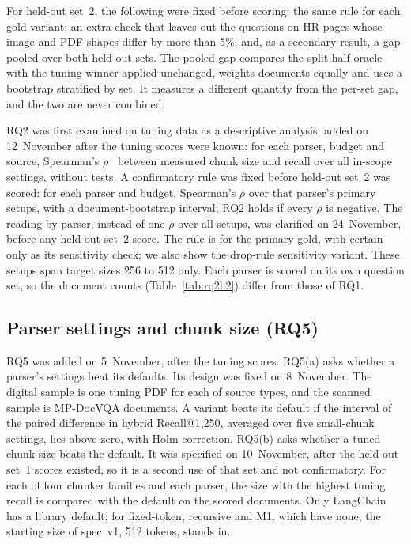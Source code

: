 For held-out set~2, the following were fixed before scoring: the same rule for
each gold variant; an extra check that leaves out the questions on \RQoneHRCheckPages{} HR pages
whose image and PDF shapes differ by more than 5\%; and, as a secondary
result, a gap pooled over both held-out sets. The pooled gap compares the
split-half oracle with the tuning winner applied unchanged, weights documents
equally and uses a bootstrap stratified by set. It measures a different
quantity from the per-set gap, and the two are never combined.

RQ2 was first examined on tuning data as a descriptive analysis, added on
12~November after the tuning scores were known: for each parser, budget and
source, Spearman's $\rho$~\cite{spearman} between measured chunk size and recall over all
in-scope settings, without tests. A confirmatory rule was fixed before
held-out set~2 was scored: for each parser and budget, Spearman's $\rho$ over
that parser's \RQtwoHTwoSetupsPerParser{} primary setups, with a
document-bootstrap interval; RQ2 holds if every $\rho$ is negative. The reading
by parser, instead of one $\rho$ over all \RQoneSetups{} setups, was
clarified on 24~November, before any held-out set~2 score. The rule is for the
primary gold, with certain-only as its sensitivity check; we also show the
drop-rule sensitivity variant. These setups span target sizes 256 to 512 only. Each parser is scored on
its own question set, so the document counts (Table~\ref{tab:rq2h2}) differ
from those of RQ1.

\subsection{Parser settings and chunk size (RQ5)}\label{sec:rq5method}

RQ5 was added on 5~November, after the tuning scores. RQ5(a) asks whether a
parser's settings beat its defaults. Its design was fixed on 8~November. The
digital sample is one tuning PDF for each of \RQfiveADigitalDocuments{} source
types, and the scanned sample is \ManualOcrVariantsIdenticalDocuments{}
MP-DocVQA documents. A variant beats its default if the interval of the paired
difference in hybrid Recall@1,250, averaged over five small-chunk settings,
lies above zero, with Holm correction. RQ5(b) asks whether a tuned chunk size
beats the default. It was specified on 10~November, after the held-out set~1
scores existed, so it is a second use of that set and not confirmatory. For
each of four chunker families and each parser, the size with the highest tuning
recall is compared with the default on the \RQfiveBDocuments{} scored documents.
Only LangChain has a library default; for fixed-token, recursive and M1, which
have none, the starting size of spec~v1, 512 tokens, stands in.

